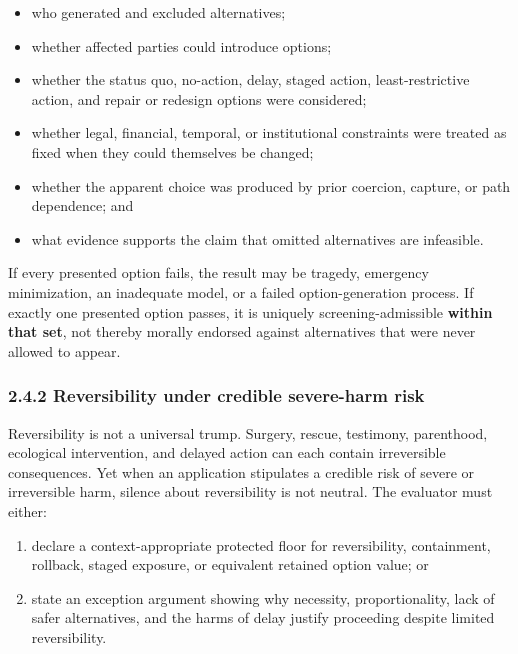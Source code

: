 \documentclass[
  11pt,
]{article}
\providecommand{\tightlist}{%
  \setlength{\itemsep}{0pt}\setlength{\parskip}{0pt}}
\begin{document}
\begin{itemize}
\tightlist
\item
  who generated and excluded alternatives;
\item
  whether affected parties could introduce options;
\item
  whether the status quo, no-action, delay, staged action,
  least-restrictive action, and repair or redesign options were
  considered;
\item
  whether legal, financial, temporal, or institutional constraints were
  treated as fixed when they could themselves be changed;
\item
  whether the apparent choice was produced by prior coercion, capture,
  or path dependence; and
\item
  what evidence supports the claim that omitted alternatives are
  infeasible.
\end{itemize}

If every presented option fails, the result may be tragedy, emergency
minimization, an inadequate model, or a failed option-generation
process. If exactly one presented option passes, it is uniquely
screening-admissible \textbf{within that set}, not thereby morally
endorsed against alternatives that were never allowed to appear.

\subsubsection{2.4.2 Reversibility under credible severe-harm
risk}\label{reversibility-under-credible-severe-harm-risk}

Reversibility is not a universal trump. Surgery, rescue, testimony,
parenthood, ecological intervention, and delayed action can each contain
irreversible consequences. Yet when an application stipulates a credible
risk of severe or irreversible harm, silence about reversibility is not
neutral. The evaluator must either:

\begin{enumerate}
\def\labelenumi{\arabic{enumi}.}
\tightlist
\item
  declare a context-appropriate protected floor for reversibility,
  containment, rollback, staged exposure, or equivalent retained option
  value; or
\item
  state an exception argument showing why necessity, proportionality,
  lack of safer alternatives, and the harms of delay justify proceeding
  despite limited reversibility.
\end{enumerate}
\end{document}
